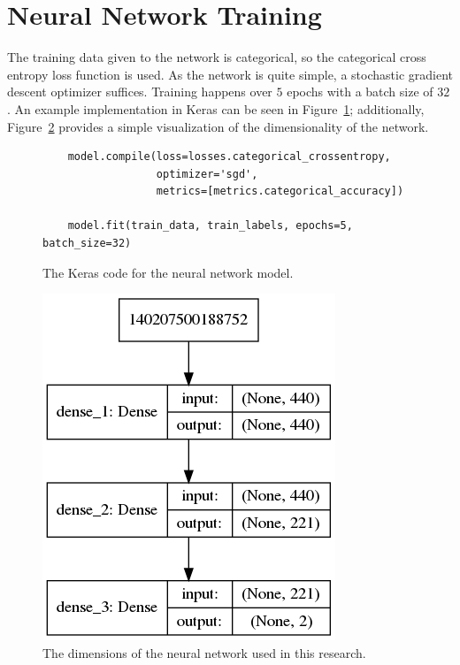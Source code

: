 \documentclass[paper=a4paper]{report}
\begin{document}
\FloatBarrier
\section{Neural Network Training}

The training data given to the network is categorical, so the categorical cross entropy loss
function is used. As the network is quite simple, a stochastic gradient descent optimizer suffices.
Training happens over $5$ epochs with a batch size of $32$. An example implementation in Keras can
be seen in Figure~\ref{fig:code_for_training}; additionally, Figure~\ref{fig:neural_network_model}
provides a simple visualization of the dimensionality of the network.

\begin{figure}[h]
    \centering
    \begin{verbatim}
    model.compile(loss=losses.categorical_crossentropy,
                  optimizer='sgd',
                  metrics=[metrics.categorical_accuracy])
    
    model.fit(train_data, train_labels, epochs=5, batch_size=32)
    \end{verbatim}
    \caption{The Keras code for the neural network model.}
    \label{fig:code_for_training}
\end{figure}

\begin{figure}[h]
    \centering
    \includegraphics[scale=0.5]{figures/neural_network_model.png}
    \caption[]{The dimensions of the neural network used in this research.}
    \label{fig:neural_network_model}
\end{figure}
\end{document}
